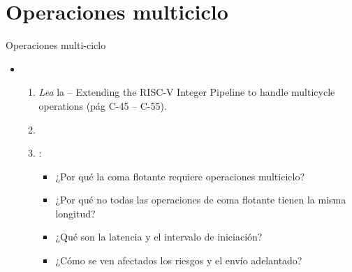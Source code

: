 \section{Operaciones multiciclo}

\begin{frame}[t]{Operaciones multi-ciclo}
\begin{itemize}
  \item {}
    \begin{enumerate}
      \item \emph{Lea} la  -- Extending the RISC-V Integer Pipeline
            to handle multicycle operations (pág C-45 -- C-55).
        \item \bibhennessy

      \item {}:
        \begin{itemize}
          \item ¿Por qué la coma flotante requiere operaciones multiciclo?
          \item ¿Por qué no todas las operaciones de coma flotante tienen la misma longitud?
          \item ¿Qué son la latencia y el intervalo de iniciación?
          \item ¿Cómo se ven afectados los riesgos y el envío adelantado?
        \end{itemize}
    \end{enumerate}
\end{itemize}
\end{frame}
